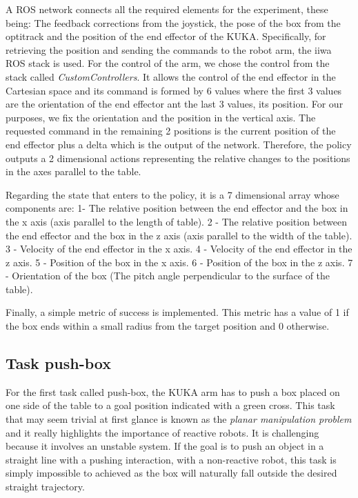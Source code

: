 A ROS network connects all the required elements for the experiment, these being: The feedback corrections from the joystick, the pose of the box from the optitrack and the position of the end effector of the KUKA. Specifically, for retrieving the position and sending the commands to the robot arm, the iiwa ROS stack \cite{iiwa} is used. For the control of the arm, we chose the control from the stack called \textit{CustomControllers}. It allows the control of the end effector in the Cartesian space and its command is formed by 6 values where the first 3 values are the orientation of the end effector ant the last 3 values, its position. For our purposes, we fix the orientation and the position in the vertical axis. The requested command in the remaining 2 positions is the current position of the end effector plus a delta which is the output of the network. Therefore, the policy outputs a 2 dimensional actions representing the relative changes to the positions in the axes parallel to the table.

Regarding the state that enters to the policy, it is a 7 dimensional array whose components are: 1- The relative position between the end effector and the box in the x axis (axis parallel to the length of table).
2 - The relative position between the end effector and the box in the z axis (axis parallel to the width of the table).
3 - Velocity of the end effector in the x axis.
4 - Velocity of the end effector in the z axis.
5 - Position of the box in the x axis.
6 - Position of the box in the z axis.
7 - Orientation of the box (The pitch angle perpendicular to the surface of the table).

Finally, a simple metric of success is implemented. This metric has a value of 1 if the box ends within a small radius from the target position and 0 otherwise.

\subsection{Task push-box}
\label{subsection:Push box in a straight line}

For the first task called push-box, the KUKA arm has to push a box placed on one side of the table to a goal position indicated with a green cross. This task that may seem trivial at first glance is known as the \textit{planar manipulation problem} \cite{constant_velocity} and it really highlights the importance of reactive robots. It is challenging because it involves an unstable system. If the goal is to push an object in a straight line with a pushing interaction, with a non-reactive robot, this task is simply impossible to achieved as the box will naturally fall outside the desired straight trajectory. 

